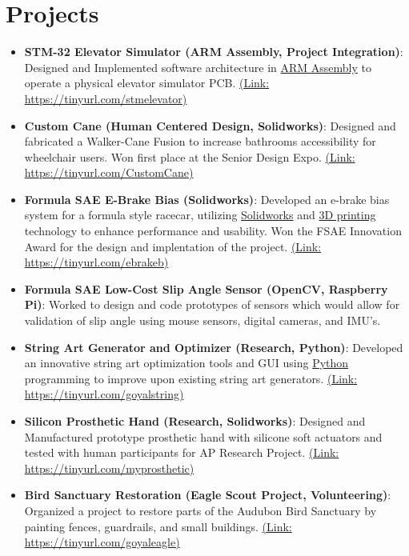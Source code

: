 \documentclass[letterpaper,10pt]{article}
\newcommand{\resumeItem}[2]{
  \item\small{
    \textbf{#1}{: #2 \vspace{-2pt}}
  }
}
\newcommand{\resumeSubItem}[2]{\resumeItem{#1}{#2}\vspace{-3pt}}
\newcommand{\resumeSubHeadingListStart}{\begin{itemize}[leftmargin=*]}
\newcommand{\resumeSubHeadingListEnd}{\end{itemize}}
\begin{document}
\section{Projects}
  \resumeSubHeadingListStart
    \resumeSubItem{STM-32 Elevator Simulator (ARM Assembly, Project Integration)}
    {Designed and Implemented software architecture in \underline{ARM Assembly} to operate a physical elevator simulator PCB. \href{https://tinyurl.com/stmelevator}{(Link: https://tinyurl.com/stmelevator)}}
    \resumeSubItem{Custom Cane (Human Centered Design, Solidworks)}
    {Designed and fabricated a Walker-Cane Fusion to increase bathrooms accessibility for wheelchair users. Won first place at the Senior Design Expo. \href{https://tinyurl.com/CustomCane}{(Link: https://tinyurl.com/CustomCane)}}
    \resumeSubItem{Formula SAE E-Brake Bias (Solidworks)}
    {Developed an e-brake bias system for a formula style racecar, utilizing \underline{Solidworks} and \underline{3D printing} technology to enhance performance and usability. Won the FSAE Innovation Award for the design and implentation of the project. \href{https://tinyurl.com/ebrakeb}{(Link: https://tinyurl.com/ebrakeb)}}
    \resumeSubItem{Formula SAE Low-Cost Slip Angle Sensor (OpenCV, Raspberry Pi)}
    {Worked to design and code prototypes of sensors which would allow for validation of slip angle using mouse sensors, digital cameras, and IMU's.}
    \resumeSubItem{String Art Generator and Optimizer (Research, Python)}
    {Developed an innovative string art optimization tools and GUI using \underline{Python} programming to improve upon existing string art generators. \href{https://tinyurl.com/goyalstring}{(Link: https://tinyurl.com/goyalstring)}}
    \resumeSubItem{Silicon Prosthetic Hand (Research, Solidworks)}
    {Designed and Manufactured prototype prosthetic hand with silicone soft actuators and tested with human participants for AP Research Project. \href{https://tinyurl.com/myprosthetic}{(Link: https://tinyurl.com/myprosthetic)}}
    \resumeSubItem{Bird Sanctuary Restoration (Eagle Scout Project, Volunteering)}
    {Organized a project to restore parts of the Audubon Bird Sanctuary by painting fences, guardrails, and small buildings. \href{https://tinyurl.com/goyaleagle}{(Link: https://tinyurl.com/goyaleagle)}}
  \resumeSubHeadingListEnd
\vspace{-5pt}
\end{document}
